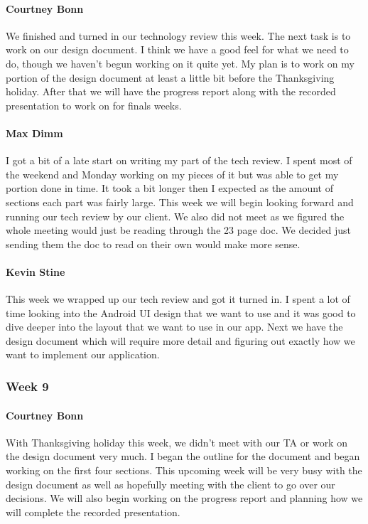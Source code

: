 			\paragraph{Courtney Bonn}
			We finished and turned in our technology review this week. The next task is to work on our design document. I think we have a good feel for what we need to do, though we haven't begun working on it quite yet. My plan is to work on my portion of the design document at least a little bit before the Thanksgiving holiday. After that we will have the progress report along with the recorded presentation to work on for finals weeks.

			\paragraph{Max Dimm}
			I got a bit of a late start on writing my part of the tech review. I spent most of the weekend and Monday working on my pieces of it but was able to get my portion done in time. It took a bit longer then I expected as the amount of sections each part was fairly large. This week we will begin looking forward and running our tech review by our client. We also did not meet as we figured the whole meeting would just be reading through the 23 page doc. We decided just sending them the doc to read on their own would make more sense.

			\paragraph{Kevin Stine}
			This week we wrapped up our tech review and got it turned in. I spent a lot of time looking into the Android UI design that we want to use and it was good to dive deeper into the layout that we want to use in our app. Next we have the design document which will require more detail and figuring out exactly how we want to implement our application.

		\subsubsection{Week 9}

			\paragraph{Courtney Bonn}
			With Thanksgiving holiday this week, we didn't meet with our TA or work on the design document very much. I began the outline for the document and began working on the first four sections. This upcoming week will be very busy with the design document as well as hopefully meeting with the client to go over our decisions. We will also begin working on the progress report and planning how we will complete the recorded presentation.

